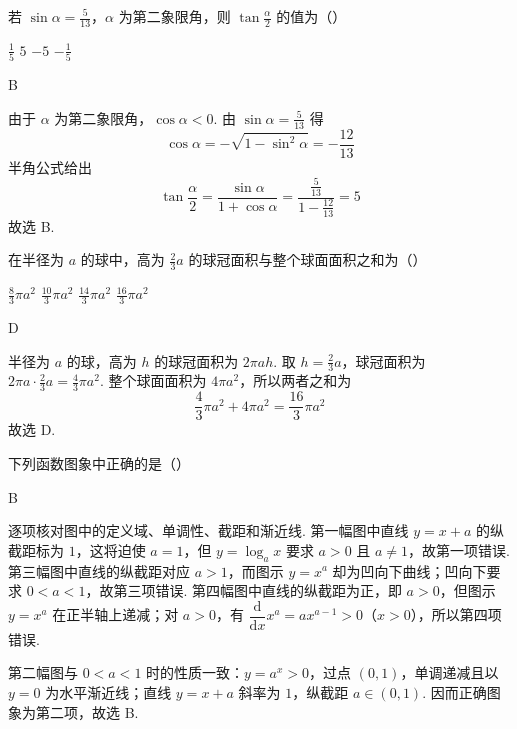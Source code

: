 \documentclass[UTF8,a4paper,oneside,11pt]{ctexbook}
\begin{document}
\begin{problem}
若 \(\sin\alpha=\frac{5}{13}\)，\(\alpha\) 为第二象限角，则 \(\tan\frac{\alpha}{2}\) 的值为（\quad）

\choices
    {\(\frac{1}{5}\)}
    {\(5\)}
    {\(-5\)}
    {\(-\frac{1}{5}\)}
\end{problem}

\begin{answer}
B
\end{answer}

\begin{solution}
由于 \(\alpha\) 为第二象限角，\(\cos\alpha<0\). 由 \(\sin\alpha=\frac5{13}\) 得
\[
\cos\alpha=-\sqrt{1-\sin^2\alpha}=-\frac{12}{13}
\]
半角公式给出
\[
\tan\frac\alpha2=\frac{\sin\alpha}{1+\cos\alpha}=\frac{\frac5{13}}{1-\frac{12}{13}}=5
\]
故选 B.
\end{solution}

\begin{problem}
在半径为 \(a\) 的球中，高为 \(\frac{2}{3}a\) 的球冠面积与整个球面面积之和为（\quad）

\choices
    {\(\frac{8}{3}\pi a^2\)}
    {\(\frac{10}{3}\pi a^2\)}
    {\(\frac{14}{3}\pi a^2\)}
    {\(\frac{16}{3}\pi a^2\)}
\end{problem}

\begin{answer}
D
\end{answer}

\begin{solution}
半径为 \(a\) 的球，高为 \(h\) 的球冠面积为 \(2\pi ah\). 取 \(h=\frac23a\)，球冠面积为 \(2\pi a\cdot\frac23a=\frac43\pi a^2\). 整个球面面积为 \(4\pi a^2\)，所以两者之和为
\[
\frac43\pi a^2+4\pi a^2=\frac{16}{3}\pi a^2
\]
故选 D.
\end{solution}

\begin{problem}
下列函数图象中正确的是（\quad）

\choices
    {}
    {}
    {}
    {}
\end{problem}

\begin{answer}
B
\end{answer}

\begin{solution}
逐项核对图中的定义域、单调性、截距和渐近线. 第一幅图中直线 \(y=x+a\) 的纵截距标为 \(1\)，这将迫使 \(a=1\)，但 \(y=\log_a x\) 要求 \(a>0\) 且 \(a\ne1\)，故第一项错误. 第三幅图中直线的纵截距对应 \(a>1\)，而图示 \(y=x^a\) 却为凹向下曲线；凹向下要求 \(0<a<1\)，故第三项错误. 第四幅图中直线的纵截距为正，即 \(a>0\)，但图示 \(y=x^a\) 在正半轴上递减；对 \(a>0\)，有 \(\dfrac{\mathrm d}{\mathrm dx}x^a=ax^{a-1}>0\)（\(x>0\)），所以第四项错误.

第二幅图与 \(0<a<1\) 时的性质一致：\(y=a^x>0\)，过点 \((0,1)\)，单调递减且以 \(y=0\) 为水平渐近线；直线 \(y=x+a\) 斜率为 \(1\)，纵截距 \(a\in(0,1)\). 因而正确图象为第二项，故选 B.
\end{solution}
\end{document}
